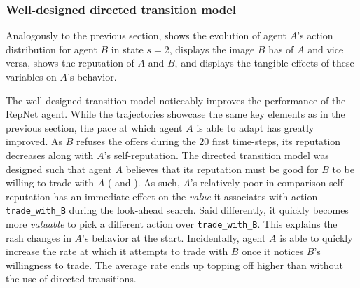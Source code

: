 \subsubsection{Well-designed directed transition model}

Analogously to the previous section,  shows the evolution of agent $A$'s action distribution for agent $B$ in state $s = 2$,  displays the image $B$ has of $A$ and vice versa,  shows the reputation of $A$ and $B$, and  displays the tangible effects of these variables on $A$'s behavior. 

The well-designed transition model noticeably improves the performance of the RepNet agent. While the trajectories showcase the same key elements as in the previous section, the pace at which agent $A$ is able to adapt has greatly improved. As $B$ refuses the offers during the 20 first time-steps, its reputation decreases along with $A$'s self-reputation. The directed transition model was designed such that agent $A$ believes that its reputation must be good for $B$ to be willing to trade with $A$ ( and ). As such, $A$'s relatively poor-in-comparison self-reputation has an immediate effect on the \textit{value} it associates with action \texttt{trade\_with\_B} during the look-ahead search. Said differently, it quickly becomes more \textit{valuable} to pick a different action over \texttt{trade\_with\_B}. This explains the rash changes in $A$'s behavior at the start. Incidentally, agent $A$ is able to quickly increase the rate at which it attempts to trade with $B$ once it notices $B$'s willingness to trade. The average rate ends up topping off higher than without the use of directed transitions.


